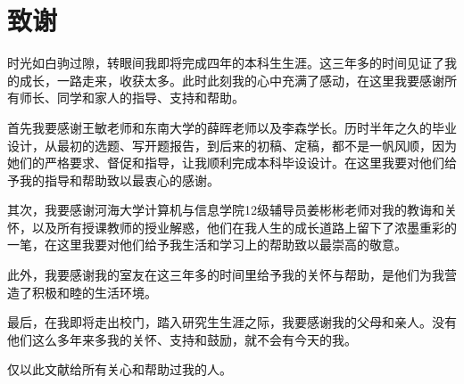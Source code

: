 \chapter*{致\hspace{1cm}谢}
时光如白驹过隙，转眼间我即将完成四年的本科生生涯。这三年多的时间见证了我的成长，一路走来，收获太多。此时此刻我的心中充满了感动，在这里我要感谢所有师长、同学和家人的指导、支持和帮助。

首先我要感谢王敏老师和东南大学的薛晖老师以及李森学长。历时半年之久的毕业设计，从最初的选题、写开题报告，到后来的初稿、定稿，都不是一帆风顺，因为她们的严格要求、督促和指导，让我顺利完成本科毕设设计。在这里我要对他们给予我的指导和帮助致以最衷心的感谢。

其次，我要感谢河海大学计算机与信息学院12级辅导员姜彬彬老师对我的教诲和关怀，以及所有授课教师的授业解惑，他们在我人生的成长道路上留下了浓墨重彩的一笔，在这里我要对他们给予我生活和学习上的帮助致以最崇高的敬意。

此外，我要感谢我的室友在这三年多的时间里给予我的关怀与帮助，是他们为我营造了积极和睦的生活环境。

最后，在我即将走出校门，踏入研究生生涯之际，我要感谢我的父母和亲人。没有他们这么多年来多我的关怀、支持和鼓励，就不会有今天的我。

仅以此文献给所有关心和帮助过我的人。